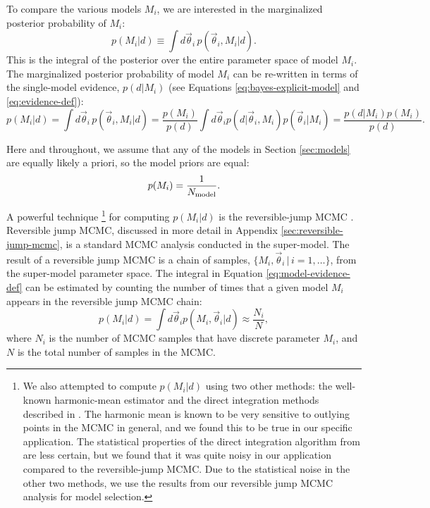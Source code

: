 \documentclass[preprint]{aastex}
\newcommand{\vtheta}{\vec{\theta}}
\begin{document}
To compare the various models $M_i$, we are interested in the
marginalized posterior probability of $M_i$:
\begin{equation}
  \label{eq:model-posterior-def}
  p(M_i|d) \equiv \int d\vtheta_i\, p(\vtheta_i, M_i|d).
\end{equation}
This is the integral of the posterior over the entire parameter space
of model $M_i$.  The marginalized posterior probability of model $M_i$
can be re-written in terms of the single-model evidence, $p(d|M_i)$
(see Equations \eqref{eq:bayes-explicit-model} and
\eqref{eq:evidence-def}):
\begin{equation}
  \label{eq:model-evidence-def}
  p(M_i|d) = \int d\vtheta_i\, p(\vtheta_i, M_i|d) = \frac{p(M_i)}{p(d)} \int d\vtheta_i
  p(d|\vtheta_i,M_i) p(\vtheta_i|M_i) = \frac{p(d|M_i) p(M_i)}{p(d)}.
\end{equation}

Here and throughout, we assume that any of the models in Section
\ref{sec:models} are equally likely a priori, so the model priors are
equal:
\begin{equation}
  p(M_i) = \frac{1}{N_{\textnormal{model}}}.
\end{equation}

A powerful technique%
\footnote{We also attempted to compute $p(M_i|d)$ using two other
  methods: the well-known harmonic-mean estimator and the direct
  integration methods described in \citet{Weinberg2010}.  The harmonic
  mean is known to be very sensitive to outlying points in the MCMC in
  general, and we found this to be true in our specific application.
  The statistical properties of the direct integration algorithm from
  \citet{Weinberg2010} are less certain, but we found that it was
  quite noisy in our application compared to the reversible-jump MCMC.
  Due to the statistical noise in the other two methods, we use the
  results from our reversible jump MCMC analysis for model
  selection.} %
for computing $p(M_i|d)$ is the reversible-jump MCMC
\citep{Green1995}.  Reversible jump MCMC, discussed in more detail in
Appendix \ref{sec:reversible-jump-mcmc}, is a standard MCMC analysis
conducted in the super-model.  The result of a reversible jump MCMC is
a chain of samples, $\{ M_i, \vtheta_i\, | \, i = 1, \ldots \}$, from the
super-model parameter space.  The integral in Equation
\eqref{eq:model-evidence-def} can be estimated by counting the number
of times that a given model $M_i$ appears in the reversible jump MCMC
chain:
\begin{equation}
  p(M_i|d) = \int d\vtheta_i p(M_i, \vtheta_i|d) \approx \frac{N_i}{N},
\end{equation}
where $N_i$ is the number of MCMC samples that have discrete parameter
$M_i$, and $N$ is the total number of samples in the MCMC. 
\end{document}
